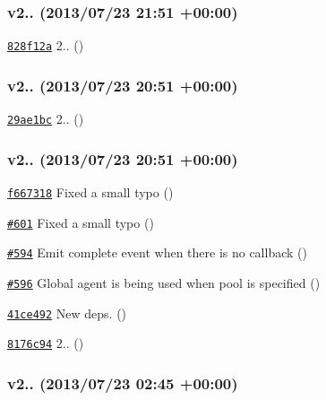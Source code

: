 \subsubsection*{v2.. (2013/07/23 21\+:51 +00\+:00)}


\begin{DoxyItemize}
\item \href{https://github.com/mikeal/request/commit/828f12a1ae0f187deee4d531b2eaf7531169aaf2}{\tt 828f12a} 2.. ()
\end{DoxyItemize}

\subsubsection*{v2.. (2013/07/23 20\+:51 +00\+:00)}


\begin{DoxyItemize}
\item \href{https://github.com/mikeal/request/commit/29ae1bc454c03216beeea69d65b538ce4f61e8c1}{\tt 29ae1bc} 2.. ()
\end{DoxyItemize}

\subsubsection*{v2.. (2013/07/23 20\+:51 +00\+:00)}


\begin{DoxyItemize}
\item \href{https://github.com/mikeal/request/commit/f66731870d5f3e0e5655cd89612049b540c34714}{\tt f667318} Fixed a small typo ()
\item \href{https://github.com/mikeal/request/pull/601}{\tt \#601} Fixed a small typo ()
\item \href{https://github.com/mikeal/request/pull/594}{\tt \#594} Emit complete event when there is no callback ()
\item \href{https://github.com/mikeal/request/pull/596}{\tt \#596} Global agent is being used when pool is specified ()
\item \href{https://github.com/mikeal/request/commit/41ce4926fb08242f19135fd3ae10b18991bc3ee0}{\tt 41ce492} New deps. ()
\item \href{https://github.com/mikeal/request/commit/8176c94d5d17bd14ef4bfe459fbfe9cee5cbcc6f}{\tt 8176c94} 2.. ()
\end{DoxyItemize}

\subsubsection*{v2.. (2013/07/23 02\+:45 +00\+:00)}


